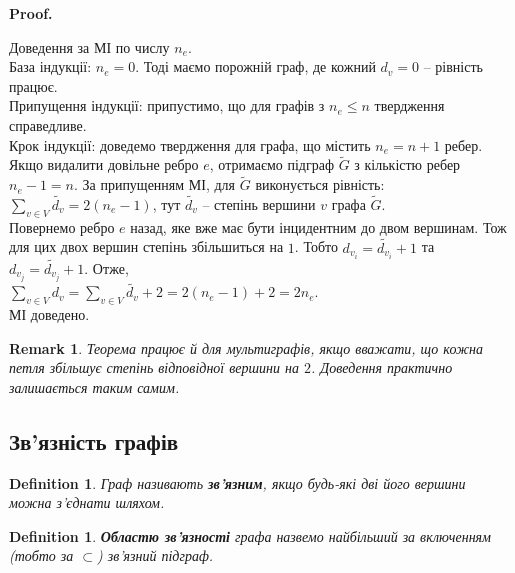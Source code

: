 \documentclass[a4paper, 14pt]{extarticle}
\makeatletter
\theoremstyle{theoremdd}
\theoremstyle{theoremdd}
\newtheorem{definition}[theorem]{Definition}
\theoremstyle{theoremdd}
\theoremstyle{theoremdd}
\theoremstyle{theoremdd}
\theoremstyle{theoremdd}
\theoremstyle{theoremdd}
\theoremstyle{theoremdd}
\theoremstyle{theoremdd}
\theoremstyle{theoremdd}
\theoremstyle{theoremdd}
\newtheorem{remark}[theorem]{Remark}
\theoremstyle{theoremdd}
\theoremstyle{theoremdd}
\theoremstyle{theoremdd}
\theoremstyle{theoremdd}
\renewenvironment{proof}[1][Proof.\\]{\par
\pushQED{\hfill \qed}%
\normalfont \topsep6\p@\@plus6\p@\relax
\trivlist
\item\relax
{\bfseries
#1\@addpunct{.}}\hspace\labelsep\ignorespaces
}{%
\popQED\endtrivlist\@endpefalse
}
\makeatother
\begin{document}
\begin{proof}
Доведення за МІ по числу $n_e$.\\
База індукції: $n_e = 0$. Тоді маємо порожній граф, де кожний $d_v = 0$ -- рівність працює.\\
Припущення індукції: припустимо, що для графів з $n_e \leq n$ твердження справедливе.\\
Крок індукції: доведемо твердження для графа, що містить $n_e = n+1$ ребер. Якщо видалити довільне ребро $e$, отримаємо підграф $\tilde{G}$ з кількістю ребер $n_e-1=n$. За припущенням МІ, для $\tilde{G}$ виконується рівність:\\
$\displaystyle\sum_{v \in V} \tilde{d_v} = 2(n_e-1)$, тут $\tilde{d_v}$ -- степінь вершини $v$ графа $\tilde{G}$.\\
Повернемо ребро $e$ назад, яке вже має бути інцидентним до двом вершинам. Тож для цих двох вершин степінь збільшиться на $1$. Тобто $d_{v_i} = \tilde{d_{v_i}} + 1$ та $d_{v_j} = \tilde{d_{v_j}} + 1$. Отже,\\
$\displaystyle\sum_{v \in V} d_v = \sum_{v \in V} \tilde{d_v} + 2 = 2(n_e-1) + 2 = 2n_e$.\\
МІ доведено.
\end{proof}

\begin{remark}
Теорема працює й для мультиграфів, якщо вважати, що кожна петля збільшує степінь відповідної вершини на $2$. Доведення практично залишається таким самим.
\end{remark}

\subsection{Зв'язність графів}
\begin{definition}
Граф називають \textbf{зв'язним}, якщо будь-які дві його вершини можна з'єднати шляхом.
\end{definition}

\begin{definition}
\textbf{Областю зв'язності} графа назвемо найбільший за включенням (тобто за $\subset$) зв'язний підграф.
\end{definition}
\end{document}
